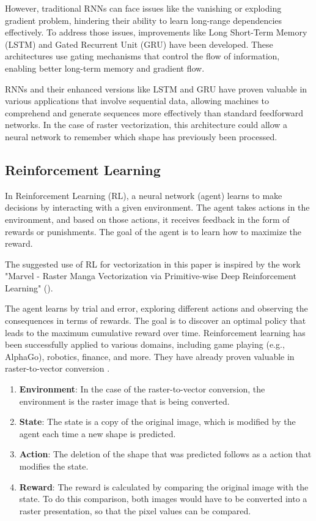 \documentclass[12pt, a4paper, titlepage]{report}
\begin{document}
However, traditional RNNs can face issues like the vanishing or exploding gradient problem, hindering their ability to learn long-range dependencies effectively.
To address those issues, improvements like Long Short-Term Memory (LSTM) and Gated Recurrent Unit (GRU) have been developed. These architectures use gating mechanisms that control the flow of information, enabling better long-term memory and gradient flow.

RNNs and their enhanced versions like LSTM and GRU have proven valuable in various applications that involve sequential data, allowing machines to comprehend and generate sequences more effectively than standard feedforward networks. In the case of raster vectorization, this architecture could allow a neural network to remember which shape has previously been processed.

\subsection{Reinforcement Learning}

In Reinforcement Learning (RL), a neural network (agent) learns to make decisions by interacting with a given environment. The agent takes actions in the environment, and based on those actions, it receives feedback in the form of rewards or punishments. The goal of the agent is to learn how to maximize the reward.

The suggested use of RL for vectorization in this paper is inspired by the work "Marvel - Raster Manga Vectorization via Primitive-wise Deep Reinforcement Learning"  (\cite{su_marvel_2023}).

The agent learns by trial and error, exploring different actions and observing the consequences in terms of rewards. The goal is to discover an optimal policy that leads to the maximum cumulative reward over time. Reinforcement learning has been successfully applied to various domains, including game playing (e.g., AlphaGo), robotics, finance, and more. They have already proven valuable in raster-to-vector conversion \cite{su_marvel_2023}.

\begin{enumerate}[label=\Roman*.]
   \item \textbf{Environment}: In the case of the raster-to-vector conversion, the environment is the raster image that is being converted.

   \item \textbf{State}: The state is a copy of the original image, which is modified by the agent each time a new shape is predicted.

   \item \textbf{Action}: The deletion of the shape that was predicted follows as a action that modifies the state.

   \item \textbf{Reward}: The reward is calculated by comparing the original image with the state. To do this comparison, both images would have to be converted into a raster presentation, so that the pixel values can be compared.
\end{enumerate}
\end{document}
